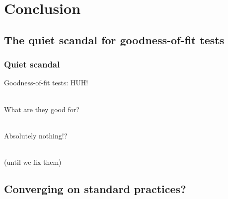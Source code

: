 \documentclass{beamer}
\begin{document}




\section{Conclusion}
\subsection{The quiet scandal for goodness-of-fit tests}

\begin{frame}
  \frametitle{Quiet scandal}

  \centering
  Goodness-of-fit tests: HUH! \\

  \ 

  What are they good for? \\

  \ 

  Absolutely nothing!? \\
  
  \

  (until we fix them)
\end{frame}


\subsection{Converging on standard practices?}
\end{document}
